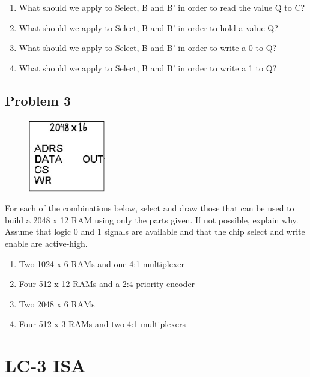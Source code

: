 \documentclass{article}
\begin{document}
\begin{enumerate}[label=\alph*.]
\item What should we apply to Select, B and B’ in order to read the value Q to C?
\item What should we apply to Select, B and B’ in order to hold a value Q?
\item What should we apply to Select, B and B’ in order to write a 0 to Q?
\item What should we apply to Select, B and B’ in order to write a 1 to Q?
\end{enumerate}

\newpage
\subsection*{Problem 3}
\begin{figure}[!h]
    \centering
    \includegraphics[width=0.3\textwidth]{figures/memory_q1.jpg}
\end{figure}
For each of the combinations below, select and draw those that can be used to build a 2048 x 12 RAM using only the parts given. If not possible, explain why. Assume that logic 0 and 1 signals are available and that the chip select and write enable are active-high.

\begin{enumerate}[label=\alph*.]
\item Two 1024 x 6 RAMs and one 4:1 multiplexer
\item Four 512 x 12 RAMs and a 2:4 priority encoder
\item Two 2048 x 6 RAMs	
\item Four 512 x 3 RAMs and two 4:1 multiplexers
\end{enumerate}


\newpage
\section*{LC-3 ISA}
\end{document}
